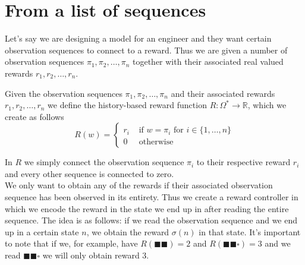 \section{From a list of sequences}
\label{sec:rc-sequences}
Let's say we are designing a model for an engineer and they want certain observation sequences to connect to a reward. Thus we are given a number of observation sequences $\pi_1,\pi_2,\dots,\pi_n$ together with their associated real valued rewards $r_1,r_2,\dots,r_n$.
\begin{definition}
Given the observation sequences $\pi_1,\pi_2,\dots,\pi_n$ and their associated rewards $r_1,r_2,\dots,r_n$ we define the history-based reward function $R:\Omega^*\to\mathbb{R}$, which we create as follows
\[R(w) = \begin{cases}
	r_i &\text{ if } w=\pi_i \text { for } i\in \{1,\dots,n\} \\
	0   &\text{ otherwise}
	\end{cases}\]
	\label{d:created_reward_function}
\end{definition}
In $R$ we simply connect the observation sequence $\pi_i$ to their respective reward $r_i$ and every other sequence is connected to zero.\\

We only want to obtain any of the rewards if their associated observation sequence has been observed in its entirety. Thus we create a reward controller in which we encode the reward in the state we end up in after reading the entire sequence. The idea is as follows: if we read the observation sequence and we end up in a certain state $n$, we obtain the reward $\sigma(n)$ in that state. It's important to note that if we, for example, have $R(\blacksquare\blacksquare)=2$ and $R(\blacksquare\blacksquare\square)=3$ and we read $\blacksquare\blacksquare\square$ we will only obtain reward $3$. 

